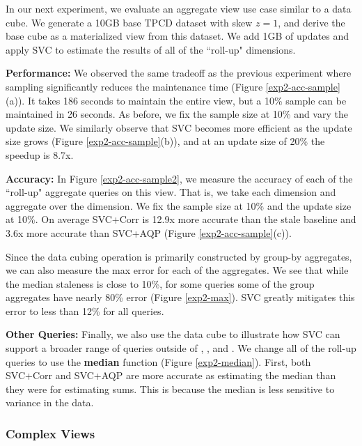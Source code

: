 In our next experiment, we evaluate an aggregate view use case similar to a data cube.
We generate a 10GB base TPCD dataset with skew $z=1$, and derive the base cube as a materialized view from this dataset.
We add 1GB of updates and apply SVC to estimate the results of all of the ``roll-up" dimensions.

\textbf{Performance: }
We observed the same tradeoff as the previous experiment where sampling significantly reduces the maintenance time (Figure \ref{exp2-acc-sample}(a)).
It takes 186 seconds to maintain the entire view, but a 10\% sample can be maintained in 26 seconds.
As before, we fix the sample size at 10\% and vary the update size.
We similarly observe that SVC becomes more efficient as the update size grows (Figure \ref{exp2-acc-sample}(b)), and at an update size of 20\%  the speedup is 8.7x.

\textbf{Accuracy: }
In Figure \ref{exp2-acc-sample2}, we measure the accuracy of each of the ``roll-up" aggregate queries on this view.
That is, we take each dimension and aggregate over the dimension.
We fix the sample size at 10\% and the update size at 10\%.
On average SVC+Corr is 12.9x more accurate than the stale baseline and 3.6x more accurate than SVC+AQP (Figure \ref{exp2-acc-sample}(c)). 

Since the data cubing operation is primarily constructed by group-by aggregates, we can also measure the max error for each of the aggregates.
We see that while the median staleness is close to 10\%, for some queries some of the group aggregates have nearly 80\% error (Figure \ref{exp2-max}).
SVC greatly mitigates this error to less than 12\% for all queries.

\textbf{Other Queries: }
Finally, we also use the data cube to illustrate how SVC can support a broader range of queries outside of \sumfunc, \countfunc, and \avgfunc.
We change all of the roll-up queries to use the \textbf{median} function (Figure \ref{exp2-median}).
First, both SVC+Corr and SVC+AQP are more accurate as estimating the median than they were for estimating sums. 
This is because the median is less sensitive to variance in the data.

\subsubsection{Complex Views}

